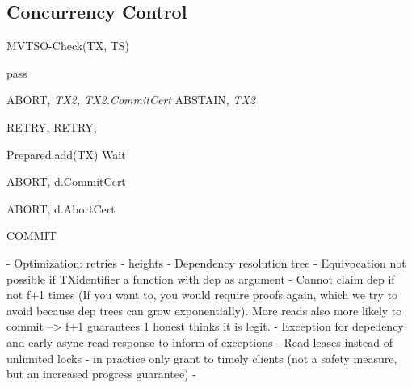 \subsection{Concurrency Control}
\begin{algorithm}
\caption{MVTSO-Check(TX, TS)}\label{euclid}
\begin{algorithmic}[1]
\State pass
\EndIf

          \State  \Return ABORT, \textit{TX2, TX2.CommitCert}
        \EndIf
          \State  \Return ABSTAIN, \textit{TX2}
        \EndIf
        
        
        
\EndFor

          \State  \Return RETRY, %
        \EndIf
          \State  \Return RETRY, %
        \EndIf

\EndFor
\State Prepared.add(TX) 
\State Wait
\EndWhile

        	\State \Return ABORT, d.CommitCert
          	\EndIf
       
		\Else 
		\State \Return ABORT, d.AbortCert
		\EndIf
\EndFor


\State \Return COMMIT


\end{algorithmic}
\end{algorithm}


 - Optimization: retries - heights
 - Dependency resolution tree
 		- Equivocation not possible if TXidentifier a function with dep as argument
 		- Cannot claim dep if not f+1 times (If you want to, you would require proofs again, which we try to avoid because dep trees can grow exponentially). More reads also more likely to commit --> f+1 guarantees 1 honest thinks it is legit.
 - Exception for depedency and early async read response to inform of exceptions
 - Read leases instead of unlimited locks - in practice only grant to timely clients (not a safety measure, but an increased progress guarantee)
 - 
